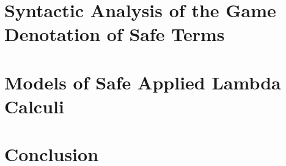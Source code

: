\documentclass[11pt,a4paper,twoside,openright,draft]{myown}
\begin{document}
\chapter{Syntactic Analysis of the Game Denotation of Safe Terms}
    \label{chap:syntactic_gamesem}
    


\chapter{Models of Safe Applied Lambda Calculi}
    \label{chap:model}
    

\chapter{Conclusion}
    \label{chap:conclusion}
    




\pdfsyncstop

\cleardoublepage
{}
{}
  
  

  \cleardoublepage
  \printnotations

  \clearpage
  \printindex

\pdfsyncstart
\end{document}
